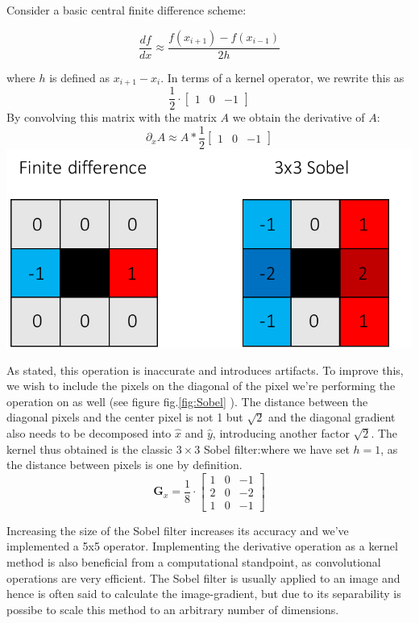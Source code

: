 \documentclass{Dissertate}
\begin{document}
Consider a basic central finite difference scheme:

\[
\frac{df}{dx}\approx\frac{f(x_{i+1})-f(x_{i-1})}{2h}
\]

where \(h\) is defined as \(x_{i+1}-x_{i}\). In terms of a kernel
operator, we rewrite this as \[
\frac{1}{2}\cdot
\begin{bmatrix}
1 & 0 & -1
\end{bmatrix}
\] By convolving this matrix with the matrix \(A\) we obtain the
derivative of \(A\): \[
\partial_xA\approx A*\frac{1}{2}\begin{bmatrix}
1 & 0 & -1
\end{bmatrix}
\] \includegraphics{source/figures/pdf/derivative.pdf}

As stated, this operation is inaccurate and introduces artifacts. To
improve this, we wish to include the pixels on the diagonal of the pixel
we're performing the operation on as well (see figure
fig.\ref{fig:Sobel} ). The distance between the diagonal pixels and the
center pixel is not 1 but \(\sqrt{2}\) and the diagonal gradient also
needs to be decomposed into \(\hat{x}\) and \(\hat{y}\), introducing
another factor \(\sqrt{2}\). The kernel thus obtained is the classic
\(3\times3\) Sobel filter:where we have set \(h=1​\), as the distance
between pixels is one by definition. \[
\mathbf G_x=\frac{1}{8}\cdot
\begin{bmatrix}
1 & 0 & -1\\
2 & 0 & -2\\
1 & 0 & -1
\end{bmatrix}
\]

Increasing the size of the Sobel filter increases its accuracy and we've
implemented a 5x5 operator. Implementing the derivative operation as a
kernel method is also beneficial from a computational standpoint, as
convolutional operations are very efficient. The Sobel filter is usually
applied to an image and hence is often said to calculate the
image-gradient, but due to its separability is possibe to scale this
method to an arbitrary number of dimensions.
\end{document}

